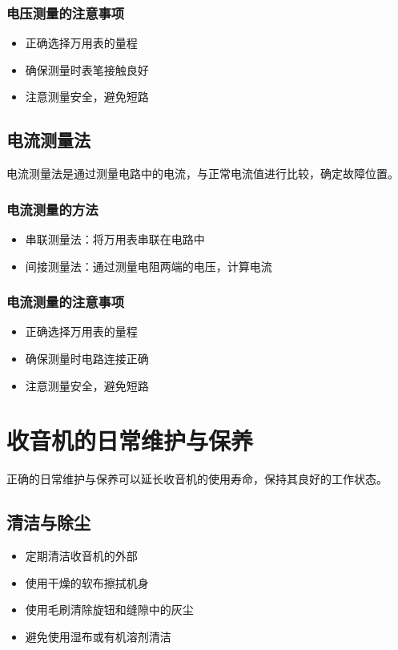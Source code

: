 \documentclass[12pt,UTF8]{ctexbook}
\begin{document}
\subsection{电压测量的注意事项}\begin{itemize}
  \item 正确选择万用表的量程
  \item 确保测量时表笔接触良好
  \item 注意测量安全，避免短路\end{itemize}

\section{电流测量法}

电流测量法是通过测量电路中的电流，与正常电流值进行比较，确定故障位置。

\subsection{电流测量的方法}\begin{itemize}
  \item 串联测量法：将万用表串联在电路中
  \item 间接测量法：通过测量电阻两端的电压，计算电流\end{itemize}

\subsection{电流测量的注意事项}\begin{itemize}
  \item 正确选择万用表的量程
  \item 确保测量时电路连接正确
  \item 注意测量安全，避免短路\end{itemize}

\chapter{收音机的日常维护与保养}

正确的日常维护与保养可以延长收音机的使用寿命，保持其良好的工作状态。

\section{清洁与除尘}\begin{itemize}
  \item 定期清洁收音机的外部
  \item 使用干燥的软布擦拭机身
  \item 使用毛刷清除旋钮和缝隙中的灰尘
  \item 避免使用湿布或有机溶剂清洁\end{itemize}
\end{document}
